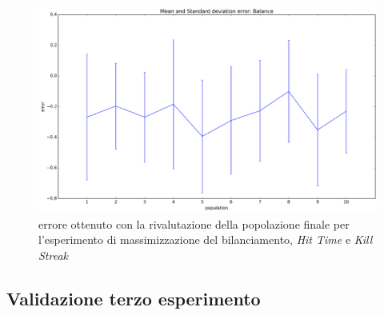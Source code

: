 \documentclass[12pt, italian]{toptesi}
\begin{document}
\begin{figure}[tp]
\centering
\includegraphics[width=1.0\textwidth]{error_delta_kill}
\caption{errore ottenuto con la rivalutazione della popolazione finale per l'esperimento di massimizzazione del bilanciamento, \emph{Hit Time} e \emph{Kill Streak}}
\label{fig:error_delta_kill}
\end{figure}

\subsection{Validazione terzo esperimento}
\end{document}
